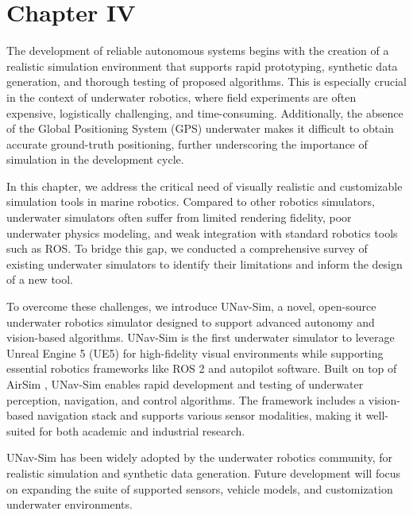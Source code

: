 \section{Chapter IV}
\label{ch:simulator}
The development of reliable autonomous systems begins with the creation of a realistic simulation environment that supports rapid prototyping, synthetic data generation, and thorough testing of proposed algorithms. This is especially crucial in the context of underwater robotics, where field experiments are often expensive, logistically challenging, and time-consuming. Additionally, the absence of the Global Positioning System (GPS) underwater makes it difficult to obtain accurate ground-truth positioning, further underscoring the importance of simulation in the development cycle.


In this chapter, we address the critical need of visually realistic and customizable simulation tools in marine robotics. Compared to other robotics simulators, underwater simulators often suffer from limited rendering fidelity, poor underwater physics modeling, and weak integration with standard robotics tools such as ROS. To bridge this gap, we conducted a comprehensive survey of existing underwater simulators to identify their limitations and inform the design of a new tool.

To overcome these challenges, we introduce UNav-Sim, a novel, open-source underwater robotics simulator designed to support advanced autonomy and vision-based algorithms. UNav-Sim is the first underwater simulator to leverage Unreal Engine 5 (UE5) \cite{unreal} for high-fidelity visual environments while supporting essential robotics frameworks like ROS 2 and autopilot software. Built on top of AirSim \cite{airsim}, UNav-Sim enables rapid development and testing of underwater perception, navigation, and control algorithms. The framework includes a vision-based navigation stack and supports various sensor modalities, making it well-suited for both academic and industrial research. %




UNav-Sim has been widely adopted by the underwater robotics community, for realistic simulation and synthetic data generation. Future development will focus on expanding the suite of supported sensors, vehicle models, and customization underwater environments. 

